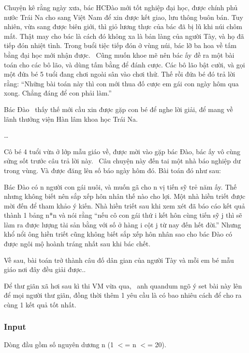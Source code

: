 



   Chuyện kê rằng ngày xưa, bác HCĐào mới tốt nghiệp đại học, được chính phủ nước Trái Na cho sang Việt Nam để xin được kết giao, lưu thông buôn bán. Tuy nhiên, vừa sang được biên giới, thì giỏ lương thực của bác đã bị lũ khi núi chôm mất. Thật may cho bác là cách đó không xa là bản làng của người Tày, và họ đã tiếp đón nhiệt tình. Trong buổi tiệc tiếp đón ở vùng núi, bác lỡ ba hoa về tấm bằng đại học mới nhận được.  Cũng muốn khoe mẽ nên bác ấy đề ra một bài toán cho các bô lão, và dùng tấm bằng để đánh cược. Các bô lão bật cười, và gọi một đứa bé 5 tuổi đang chơi ngoài sân vào chơi thử. Thế rồi đứa bé đó trả lời rằng: “Những bài toán này thì con mới thua đố cược em gái con ngày hôm qua xong. Chẳng đáng để con phải làm.”  

   Bác Đào  thấy thế mới cầu xin được gặp con bé để nghe lời giải, để mang về lãnh thưởng viện Hàn lâm khoa học Trái Na.  

   …  

   Cô bé 4 tuổi vừa ở lớp mẫu giáo về, được mời vào gặp bác Đào, bác ấy vô cùng sửng sốt trước câu trả lời này.  Câu chuyện này đến tai một nhà báo nghiệp dư trong vùng. Và được đăng lên số báo ngày hôm đó. Bài toán đó như sau:  

   Bác Đào có n người con gái nuôi, và muốn gã cho n vị tiến sỹ trẻ năm ấy. Thế nhưng không biết nên sắp xếp hôn nhân thế nào cho lợi. Một nhà hiền triết được mời đến để tham khảo ý kiến. Nhà hiền triết sau khi xem xét đã báo cáo kết quả thành 1 bảng n*n và nói rằng “nếu cô con gái thứ i kết hôn cùng tiến sỹ j thì sẽ làm ra được lượng tài sản bằng với số ở hàng i cột j từ nay đến hết đời.” Nhưng khổ nổi ông hiền triết cũng không biết sắp xếp hôn nhân sao cho bác Đào có được ngôi mộ hoành tráng nhất sau khi bác chết.  



   Về sau, bài toán trở thành câu đố dân gian của người Tày và mỗi em bé mẫu giáo nơi đây đều giải được..  



   Để thư giãn xã hơi sau kì thi VM vừa qua,  anh quandum ngõ ý set bài này lên để mọi người thư giãn, đồng thời thêm 1 yêu cầu là có bao nhiêu cách để cho ra cùng 1 kết quả tốt nhất.  

\subsubsection{   Input  }

   Dòng đầu gồm số nguyên dương n (1 $<$= n $<$= 20).  

